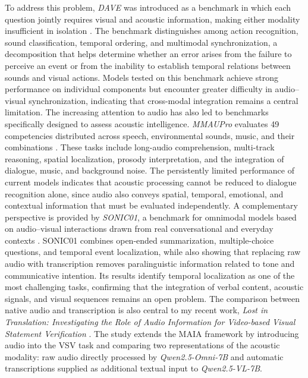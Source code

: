 To address this problem, \textit{\acs{DAVE}} was introduced as a benchmark in which each question jointly requires visual and acoustic information, making either modality insufficient in isolation \cite{radevski2026dave}. The benchmark distinguishes among action recognition, sound classification, temporal ordering, and multimodal synchronization, a decomposition that helps determine whether an error arises from the failure to perceive an event or from the inability to establish temporal relations between sounds and visual actions. Models tested on this benchmark achieve strong performance on individual components but encounter greater difficulty in audio--visual synchronization, indicating that cross-modal integration remains a central limitation.
The increasing attention to audio has also led to benchmarks specifically designed to assess acoustic intelligence. \textit{\acs{MMAUPro}} evaluates 49 competencies distributed across speech, environmental sounds, music, and their combinations \cite{kumar2026mmaupro}. These tasks include long-audio comprehension, multi-track reasoning, spatial localization, prosody interpretation, and the integration of dialogue, music, and background noise. The persistently limited performance of current models indicates that acoustic processing cannot be reduced to dialogue recognition alone, since audio also conveys spatial, temporal, emotional, and contextual information that must be evaluated independently.
A complementary perspective is provided by \textit{\acs{SONIC01}}, a benchmark for omnimodal models based on audio--visual interactions drawn from real conversational and everyday contexts \cite{radwan2026sonic}. \acs{SONIC01} combines open-ended summarization, multiple-choice questions, and temporal event localization, while also showing that replacing raw audio with transcription removes paralinguistic information related to tone and communicative intention. Its results identify temporal localization as one of the most challenging tasks, confirming that the integration of verbal content, acoustic signals, and visual sequences remains an open problem.
The comparison between native audio and transcription is also central to my recent work, \textit{Lost in Translation: Investigating the Role of Audio Information for Video-based Visual Statement Verification} \cite{deodati2026lost}. The study extends the \acs{MAIA} framework by introducing audio into the \acs{VSV} task and comparing two representations of the acoustic modality: raw audio directly processed by \textit{Qwen2.5-Omni-7B} and automatic transcriptions supplied as additional textual input to \textit{Qwen2.5-VL-7B}.
